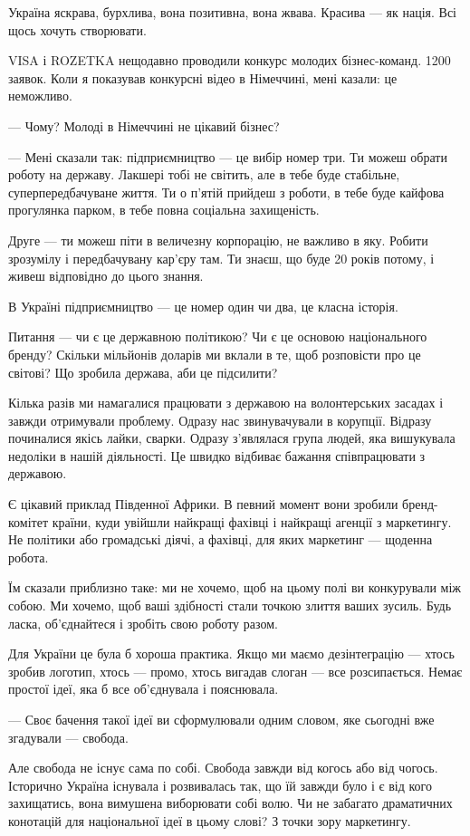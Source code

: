 Україна яскрава, бурхлива, вона позитивна, вона жвава. Красива --- як нація. Всі
щось хочуть створювати. 

VISA і ROZETKA нещодавно проводили конкурс молодих бізнес-команд. 1200 заявок.
Коли я показував конкурсні відео в Німеччині, мені казали: це неможливо.

--- Чому? Молоді в Німеччині не цікавий бізнес?

--- Мені сказали так: підприємництво --- це вибір номер три. Ти можеш обрати роботу
на державу. Лакшері тобі не світить, але в тебе буде стабільне,
суперпередбачуване життя. Ти о п’ятій прийдеш з роботи, в тебе буде кайфова
прогулянка парком, в тебе повна соціальна захищеність.

Друге --- ти можеш піти в величезну корпорацію, не важливо в яку. Робити
зрозумілу і передбачувану кар’єру там. Ти знаєш, що буде 20 років потому, і
живеш відповідно до цього знання.

В Україні підприємництво --- це номер один чи два, це класна історія.

Питання --- чи є це державною політикою? Чи є це основою національного бренду?
Скільки мільйонів доларів ми вклали в те, щоб розповісти про це світові? Що
зробила держава, аби це підсилити?

Кілька разів ми намагалися працювати з державою на волонтерських засадах і
завжди отримували проблему. Одразу нас звинувачували в корупції. Відразу
починалися якісь лайки, сварки. Одразу з’являлася група людей, яка вишукувала
недоліки в нашій діяльності. Це швидко відбиває бажання співпрацювати з
державою.

Є цікавий приклад Південної Африки. В певний момент вони зробили бренд-комітет
країни, куди увійшли найкращі фахівці і найкращі агенції з маркетингу. Не
політики або громадські діячі, а фахівці, для яких маркетинг --- щоденна робота. 

Їм сказали приблизно таке: ми не хочемо, щоб на цьому полі ви конкурували між
собою. Ми хочемо, щоб ваші здібності стали точкою злиття ваших зусиль. Будь
ласка, об’єднайтеся і зробіть свою роботу разом.

Для України це була б хороша практика. Якщо ми маємо дезінтеграцію --- хтось
зробив логотип, хтось --- промо, хтось вигадав слоган --- все розсипається. Немає
простої ідеї, яка б все об’єднувала і пояснювала.

--- Своє бачення такої ідеї ви сформулювали одним словом, яке сьогодні вже
згадували --- свобода. 

Але свобода не існує сама по собі. Свобода завжди від когось або від чогось.
Історично Україна існувала і розвивалась так, що їй завжди було і є від кого
захищатись, вона вимушена виборювати собі волю. Чи не забагато драматичних
конотацій для національної ідеї в цьому слові? З точки зору маркетингу.

